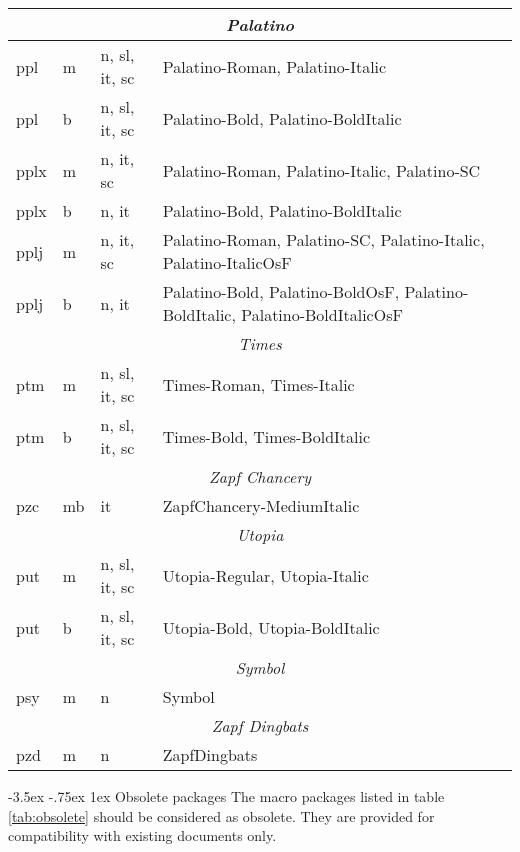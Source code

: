 \documentclass[11pt]{ltxguide}[1995/11/28]
\makeatletter
\renewcommand\section{\@startsection{section}{1}{\z@}%
{-3.5ex \@plus -.75ex}%
{1ex}%
{\normalfont\Large\bfseries}}
\makeatother
\begin{document}
\begin{table}[p]
{\begin{tabularx}{\linewidth}{|l|l|l|>{\raggedright\arraybackslash}X|}
  \multicolumn{4}{|c|}{\textit{Palatino}}\\ \hline
   ppl & m & n, sl, it, sc & Palatino-Roman, Palatino-Italic\\ \hline
   ppl & b & n, sl, it, sc & Palatino-Bold, Palatino-BoldItalic\\ \hline 
   pplx & m & n, it, sc & Palatino-Roman, Palatino-Italic, Palatino-SC\\ \hline
   pplx & b & n, it     & Palatino-Bold, Palatino-BoldItalic\\ \hline 
   pplj & m & n, it, sc & Palatino-Roman, Palatino-SC, Palatino-Italic, Palatino-ItalicOsF\\ \hline
   pplj & b & n, it     & Palatino-Bold, Palatino-BoldOsF, Palatino-BoldItalic, Palatino-BoldItalicOsF\\ \hline \hline
  \multicolumn{4}{|c|}{\textit{Times}}\\ \hline
   ptm & m & n, sl, it, sc  & Times-Roman, Times-Italic\\ \hline
   ptm & b & n, sl, it, sc  & Times-Bold, Times-BoldItalic\\ \hline \hline
  \multicolumn{4}{|c|}{\textit{Zapf Chancery}}\\ \hline
   pzc & mb & it & ZapfChancery-MediumItalic\\ \hline \hline
  \multicolumn{4}{|c|}{\textit{Utopia}}\\ \hline
   put & m & n, sl, it, sc & Utopia-Regular, Utopia-Italic\\ \hline
   put & b & n, sl, it, sc & Utopia-Bold, Utopia-BoldItalic\\ \hline \hline
  \multicolumn{4}{|c|}{\textit{Symbol}}\\ \hline
   psy & m & n & Symbol\\ \hline \hline
  \multicolumn{4}{|c|}{\textit{Zapf Dingbats}}\\ \hline
   pzd & m & n & ZapfDingbats\\ \hline
  \end{tabularx}
  \par}
\end{table}



\section{Obsolete packages}
The macro packages listed in table \vref{tab:obsolete} should be considered as obsolete.
They are provided for compatibility with existing documents only.
\end{document}
